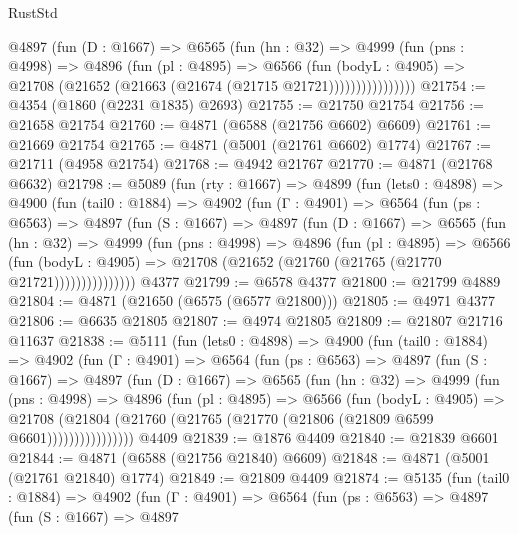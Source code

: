 \begin{lexlean}{RustStd}
\begin{coremodule}
                @4897
                  (fun (D : @1667) =>
                  @6565
                    (fun (hn : @32) =>
                    @4999
                      (fun (pns : @4998) =>
                      @4896
                        (fun (pl : @4895) =>
                        @6566
                          (fun (bodyL : @4905) =>
                          @21708 (@21652 (@21663 (@21674 (@21715 @21721))))))))))))))))
@21754 := @4354 (@1860 (@2231 @1835) @2693)
@21755 := @21750 @21754
@21756 := @21658 @21754
@21760 := @4871 (@6588 (@21756 @6602) @6609)
@21761 := @21669 @21754
@21765 := @4871 (@5001 (@21761 @6602) @1774)
@21767 := @21711 (@4958 @21754)
@21768 := @4942 @21767
@21770 := @4871 (@21768 @6632)
@21798 := @5089
    (fun (rty : @1667) =>
    @4899
      (fun (lets0 : @4898) =>
      @4900
        (fun (tail0 : @1884) =>
        @4902
          (fun (Γ : @4901) =>
          @6564
            (fun (ps : @6563) =>
            @4897
              (fun (S : @1667) =>
              @4897
                (fun (D : @1667) =>
                @6565
                  (fun (hn : @32) =>
                  @4999
                    (fun (pns : @4998) =>
                    @4896
                      (fun (pl : @4895) =>
                      @6566
                        (fun (bodyL : @4905) =>
                        @21708 (@21652 (@21760 (@21765 (@21770 @21721)))))))))))))))
    @4377
@21799 := @6578 @4377
@21800 := @21799 @4889
@21804 := @4871 (@21650 (@6575 (@6577 @21800)))
@21805 := @4971 @4377
@21806 := @6635 @21805
@21807 := @4974 @21805
@21809 := @21807 @21716 @11637
@21838 := @5111
    (fun (lets0 : @4898) =>
    @4900
      (fun (tail0 : @1884) =>
      @4902
        (fun (Γ : @4901) =>
        @6564
          (fun (ps : @6563) =>
          @4897
            (fun (S : @1667) =>
            @4897
              (fun (D : @1667) =>
              @6565
                (fun (hn : @32) =>
                @4999
                  (fun (pns : @4998) =>
                  @4896
                    (fun (pl : @4895) =>
                    @6566
                      (fun (bodyL : @4905) =>
                      @21708
                        (@21804 (@21760 (@21765 (@21770 (@21806 (@21809 @6599 @6601))))))))))))))))
    @4409
@21839 := @1876 @4409
@21840 := @21839 @6601
@21844 := @4871 (@6588 (@21756 @21840) @6609)
@21848 := @4871 (@5001 (@21761 @21840) @1774)
@21849 := @21809 @4409
@21874 := @5135
    (fun (tail0 : @1884) =>
    @4902
      (fun (Γ : @4901) =>
      @6564
        (fun (ps : @6563) =>
        @4897
          (fun (S : @1667) =>
          @4897

\end{coremodule}
\end{lexlean}
